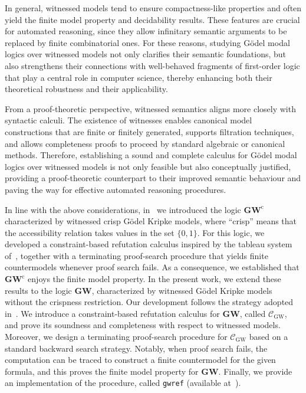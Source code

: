 \documentclass[copyright,creativecommons]{eptcs}
\newcommand{\GWCL}{\mathbf{GW}^\mathrm{c}}
\newcommand{\GWL}{\mathbf{GW}}
\newcommand{\Calcw}{\Ccal_{\mathrm{GW}}}
\newcommand{\Ccal}{\mathcal{C}}
\begin{document}
In general, witnessed models tend to ensure compactness-like properties and
often yield the finite model property and decidability
results. These features are crucial for automated reasoning,
since they allow infinitary semantic arguments to be replaced by
finite combinatorial ones. For these reasons, studying G\"odel modal
logics over witnessed models not only clarifies their semantic
foundations, but also strengthens their connections with well-behaved
fragments of first-order logic that play a central role in computer
science, thereby enhancing both their theoretical robustness and their
applicability.

From a proof-theoretic perspective, witnessed semantics aligns more
closely with syntactic calculi.
The existence of witnesses enables canonical model constructions that
are finite or finitely generated, supports filtration techniques, and
allows completeness proofs to proceed by standard algebraic or
canonical methods. Therefore, establishing a sound and complete
calculus for G\"odel modal logics over witnessed models is not only
feasible but also conceptually justified, providing a proof-theoretic
counterpart to their improved semantic behaviour and paving the way for
effective automated reasoning procedures.


In line with the above considerations, in~\cite{FerFioRod:2025} we
introduced the logic $\GWCL$ characterized by witnessed crisp G\"odel
Kripke models, where ``crisp'' means that the accessibility relation
takes values in the set $\{0,1\}$.  For this logic, we developed a
constraint-based refutation calculus inspired by the tableau system
of~\cite{BilkovaFK:22}, together with a terminating proof-search
procedure that yields finite countermodels whenever proof search
fails. As a consequence, we established that $\GWCL$ enjoys the finite
model property.  In the present work, we extend these results to the
logic $\GWL$, characterized by witnessed G\"odel Kripke models without
the crispness restriction. Our development follows the
strategy adopted in~\cite{FerFioRod:2025}.  We introduce a
constraint-based refutation calculus for $\GWL$, called $\Calcw$, and
prove its soundness and completeness with respect to witnessed
models. Moreover, we design a terminating proof-search procedure for
$\Calcw$ based on a standard backward search strategy.  Notably, when
proof search fails, the computation can be traced to construct a
finite countermodel for the given formula, and this proves the finite
model property for $\GWL$.  Finally, we provide an implementation of
the procedure, called \texttt{gwref} (available
at~\cite{gwrefProver}).
\end{document}
